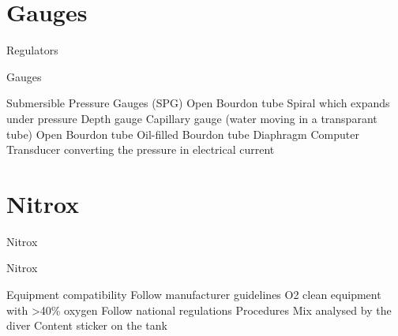 \documentclass[aspectratio=1610,english,14pt]{beamer}
\begin{document}
\section{Gauges}

\begin{frame}{Regulators}
\end{frame}
\begin{frame}{Gauges}
	\begin{outline}
		\1 Submersible Pressure Gauges (SPG)
			\2 Open Bourdon tube
			\2 Spiral which expands under pressure
		\1 Depth gauge
			\2 Capillary gauge (water moving in a transparant tube)
			\2 Open Bourdon tube
			\2 Oil-filled Bourdon tube
			\2 Diaphragm
		\1 Computer
			\2 Transducer converting the pressure in electrical current
	\end{outline}
\end{frame}

\section{Nitrox}

\begin{frame}{Nitrox}
	\mypict{../img/nitrox}
\end{frame}
\begin{frame}{Nitrox}
	\begin{outline}
		\1 Equipment compatibility
			\2 Follow manufacturer guidelines
			\2 O2 clean equipment with >40\% oxygen
			\2 Follow national regulations
		\1 Procedures
			\2 Mix analysed by the diver
			\2 Content sticker on the tank
	\end{outline}
\end{frame}
\end{document}
